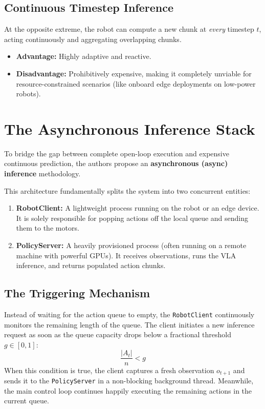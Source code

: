 \documentclass[11pt,a4paper]{article}
\begin{document}
\subsection{Continuous Timestep Inference}
At the opposite extreme, the robot can compute a new chunk at \textit{every} timestep $t$, acting continuously and aggregating overlapping chunks.
\begin{itemize}
    \item \textbf{Advantage:} Highly adaptive and reactive.
    \item \textbf{Disadvantage:} Prohibitively expensive, making it completely unviable for resource-constrained scenarios (like onboard edge deployments on low-power robots).
\end{itemize}

\section{The Asynchronous Inference Stack}
To bridge the gap between complete open-loop execution and expensive continuous prediction, the authors propose an \textbf{asynchronous (async) inference} methodology.

This architecture fundamentally splits the system into two concurrent entities:
\begin{enumerate}
    \item \textbf{RobotClient:} A lightweight process running on the robot or an edge device. It is solely responsible for popping actions off the local queue and sending them to the motors.
    \item \textbf{PolicyServer:} A heavily provisioned process (often running on a remote machine with powerful GPUs). It receives observations, runs the VLA inference, and returns populated action chunks.
\end{enumerate}

\subsection{The Triggering Mechanism}
Instead of waiting for the action queue to empty, the \texttt{RobotClient} continuously monitors the remaining length of the queue. The client initiates a new inference request as soon as the queue capacity drops below a fractional threshold $g \in [0, 1]$:
\[
    \frac{|A_t|}{n} < g
\]
When this condition is true, the client captures a fresh observation $o_{t+1}$ and sends it to the \texttt{PolicyServer} in a non-blocking background thread. Meanwhile, the main control loop continues happily executing the remaining actions in the current queue.
\end{document}
